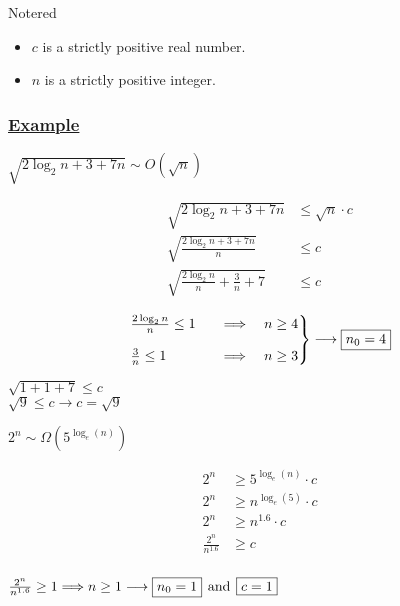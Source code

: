 \vspace{0.5cm}
\begin{prettyBox}{Note}{red}
\begin{itemize}
    \item \(c\) is a strictly positive real number.
    \item \(n\) is a strictly positive integer.
\end{itemize}
\end{prettyBox}

\newpage
\subsubsection*{\underline{Example}}
\vspace{0.25cm}
\(\sqrt{2\log_2{n}+3+7n} \sim O(\sqrt{n})\)

\begin{align*}
\sqrt{2\log_2{n}+3+7n} &\leq \sqrt{n} \cdot c\\[0.25cm]  
\sqrt{\frac{2\log_2{n}+3+7n}{n}} &\leq c\\[0.25cm]
\sqrt{\frac{2\log_2{n}}{n}+\frac{3}{n}+7} &\leq c
\end{align*}

\[
\begin{rcases}
\frac{2\log_2{n}}{n} \leq 1 \quad &\Longrightarrow \quad n\geq 4\\[0.25cm]
\frac{3}{n} \leq 1 \quad &\Longrightarrow \quad n\geq 3 
\end{rcases}\longrightarrow \boxed{n_0 = 4}
\]

\vspace{0.15cm}

\begin{center}
    \(\sqrt{1+1+7} \leq c\)\\[0.2cm]
    \(\sqrt{9} \leq c  \longrightarrow \boxed{c = \sqrt{9}}\)
\end{center}


\vspace{1cm}
\(2^n \sim \Omega(5^{\log_e(n)})\)

\begin{align*}
2^n &\geq 5^{\log_e(n)}\cdot c\\[0.25cm]  
2^n &\geq n^{\log_e(5)}\cdot c\\[0.25cm] 
2^n &\geq n^{1.6}\cdot c\\[0.25cm]  
\frac{2^n}{n^{1.6}} &\geq  c\\[0.25cm] 
\end{align*}

\begin{center}
\(\frac{2^n}{n^{1.6}} \geq 1 \Longrightarrow n\geq 1 \longrightarrow \boxed{n_0 = 1}\hspace{0.15cm} \text{and} \hspace{0.15cm} \boxed{c = 1}\)
\end{center}

